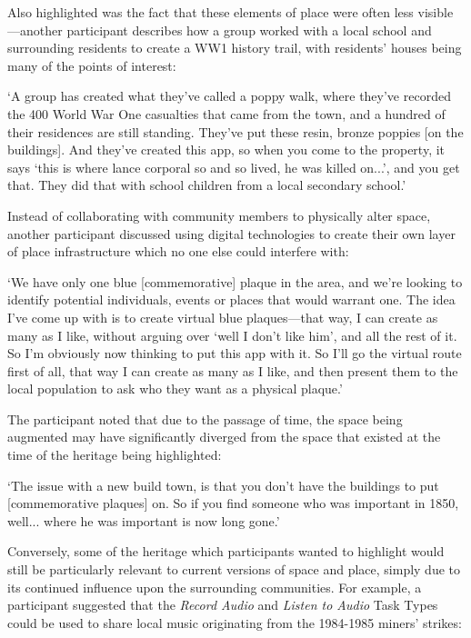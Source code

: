 Also highlighted was the fact that these elements of place were often less visible---another participant describes how a group worked with a local school and surrounding residents to create a WW1 history trail, with residents' houses being many of the points of interest:

\begin{displayquote}
`A group has created what they've called a poppy walk, where they've recorded the 400 World War One casualties that came from the town, and a hundred of their residences are still standing. They've put these resin, bronze poppies [on the buildings]. And they've created this app, so when you come to the property, it says `this is where lance corporal so and so lived, he was killed on...', and you get that. They did that with school children from a local secondary school.'
\end{displayquote}

Instead of collaborating with community members to physically alter space, another participant discussed using digital technologies to create their own layer of place infrastructure which no one else could interfere with:

\begin{displayquote}
`We have only one blue [commemorative] plaque in the area, and we're looking to identify potential individuals, events or places that would warrant one. The idea I've come up with is to create virtual blue plaques---that way, I can create as many as I like, without arguing over `well I don't like him', and all the rest of it. So I'm obviously now thinking to put this app with it. So I'll go the virtual route first of all, that way I can create as many as I like, and then present them to the local population to ask who they want as a physical plaque.'
\end{displayquote}

The participant noted that due to the passage of time, the space being augmented may have significantly diverged from the space that existed at the time of the heritage being highlighted:

\begin{displayquote}
`The issue with a new build town, is that you don't have the buildings to put [commemorative plaques] on. So if you find someone who was important in 1850, well... where he was important is now long gone.'
\end{displayquote}

Conversely, some of the heritage which participants wanted to highlight would still be particularly relevant to current versions of space and place, simply due to its continued influence upon the surrounding communities. For example, a participant suggested that the \textit{Record Audio} and \textit{Listen to Audio} Task Types could be used to share local music originating from the 1984-1985 miners' strikes:

